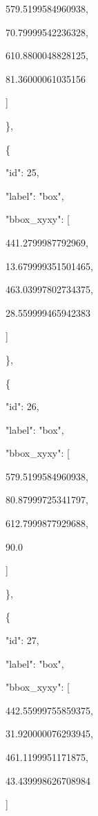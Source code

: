 \documentclass[10pt,a4paper]{article}
\begin{document}
        579.5199584960938,\allowbreak{}\par
        70.79999542236328,\allowbreak{}\par
        610.8800048828125,\allowbreak{}\par
        81.36000061035156\par
      ]\par
    \},\allowbreak{}\par
    \{\par
      "id":\allowbreak{} 25,\allowbreak{}\par
      "label":\allowbreak{} "box",\allowbreak{}\par
      "bbox\_xyxy":\allowbreak{} [\par
        441.2799987792969,\allowbreak{}\par
        13.679999351501465,\allowbreak{}\par
        463.03997802734375,\allowbreak{}\par
        28.559999465942383\par
      ]\par
    \},\allowbreak{}\par
    \{\par
      "id":\allowbreak{} 26,\allowbreak{}\par
      "label":\allowbreak{} "box",\allowbreak{}\par
      "bbox\_xyxy":\allowbreak{} [\par
        579.5199584960938,\allowbreak{}\par
        80.87999725341797,\allowbreak{}\par
        612.7999877929688,\allowbreak{}\par
        90.0\par
      ]\par
    \},\allowbreak{}\par
    \{\par
      "id":\allowbreak{} 27,\allowbreak{}\par
      "label":\allowbreak{} "box",\allowbreak{}\par
      "bbox\_xyxy":\allowbreak{} [\par
        442.55999755859375,\allowbreak{}\par
        31.920000076293945,\allowbreak{}\par
        461.1199951171875,\allowbreak{}\par
        43.439998626708984\par
      ]\par
\end{document}
